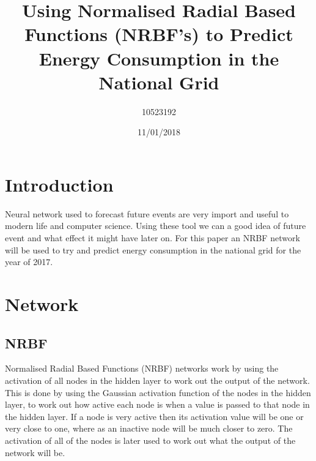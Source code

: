 \documentclass{IEEEtran}[11pt]
\title{Using Normalised Radial Based Functions (NRBF's) to Predict Energy Consumption in the National Grid}
\author{10523192}
\date{11/01/2018}
\begin{document}

\maketitle

\newpage
\section{Introduction}
\begin{flushleft}
  Neural network used to forecast future events are very import and useful to
  modern life and computer science. Using these tool we can a good idea of
  future event and what effect it might have later on. For this paper an NRBF
  network will be used to try and predict energy consumption in the national grid
  for the year of 2017.
\end{flushleft}
\section{Network}
\subsection{NRBF}
\begin{flushleft}
  Normalised Radial Based Functions (NRBF) networks work by using the activation
  of all nodes in the hidden layer to work out the output of the network. This
  is done by using the Gaussian activation function of the nodes in the hidden
  layer, to work out how active each node is when a value is passed to that
  node in the hidden layer. If a node is very active then its activation value
  will be one or very close to one, where as an inactive node will be much
  closer to zero. The activation of all of the nodes is later used to work out
  what the output of the network will be.
\end{flushleft}
\end{document}
